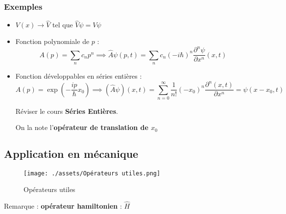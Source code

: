 \subsubsection{Exemples} %
\label{sec:Exemples}

\begin{itemize}

    \item $V(x) \to \hat{V}$ tel que $\hat{V} \psi = V \psi$
    \item Fonction polynomiale de $p$ : 
      \begin{equation}
        A(p) = \sum_{n}^{}c_n p ^{n} \implies \hat{A} \psi(p,t) = \sum_{n}^{} c_n (-i \hbar) ^{n} \frac{\partial ^{n} \psi}{\partial x ^{n}}  (x,t)
      \end{equation} 
    \item Fonction développables en séries entières : 
      \begin{equation}
        A(p) = \exp \left( - \frac{ip}{\hbar} x_0 \right) \implies (\hat{A} \psi)(x,t) = \sum_{n=0}^{\infty} \frac{1}{n!}  (-x_0) ^{n} \frac{\partial ^{n}(x,t)}{\partial x ^{n}}  = \psi(x-x_0, t)
      \end{equation}

      \begin{myproof}{}{}
      Réviser le cours \textbf{Séries Entières}.
      \end{myproof}

      


      On la note l'\textbf{opérateur de translation de $x_0$}

\end{itemize}


\subsection{Application en mécanique} %
\label{sub: Application en mécanique}

\begin{figure}[H] %
  \centering
  \texttt{[image: ./assets/Opérateurs utiles.png]}
  \caption{Opérateurs utiles}
  \label{fig:Opérateurs utiles}
\end{figure}



Remarque : \textbf{opérateur hamiltonien} : $\hat{H}$ 




